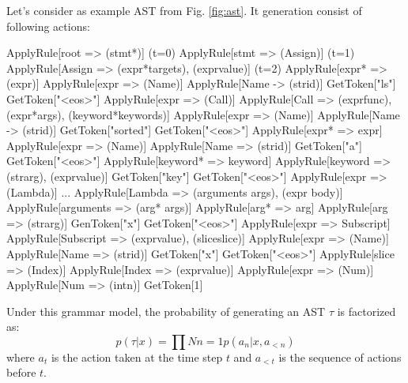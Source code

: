 Let's consider as example AST from Fig. \ref{fig:ast}. It generation consist of following actions:

\begin{codelist}
ApplyRule[root => (stmt*)] (t=0)
    ApplyRule[stmt => (Assign)] (t=1)
        ApplyRule[Assign => (expr*{targets}), (expr{value})] (t=2)
            ApplyRule[expr* => (expr)]
                ApplyRule[expr => (Name)]
                    ApplyRule[Name -> (str{id})]
                        GetToken["ls"]
                        GetToken["<eos>"]
            ApplyRule[expr => (Call)]
                ApplyRule[Call => (expr{func}), (expr*{args}), (keyword*{keywords})]
                    ApplyRule[expr => (Name)]
                        ApplyRule[Name -> (str{id})]
                            GetToken["sorted"]
                            GetToken["<eos>"]
                    ApplyRule[expr* => expr]
                        ApplyRule[expr => (Name)]
                            ApplyRule[Name => (str{id})]
                                GetToken["a"]
                                GetToken["<eos>"]
                    ApplyRule[keyword* => keyword]
                        ApplyRule[keyword => (str{arg}), (expr{value})]
                            GetToken["key"]
                            GetToken["<eos>"]
                            ApplyRule[expr => (Lambda)]
...
ApplyRule[Lambda => (arguments args), (expr body)]
    ApplyRule[arguments => (arg* args)]
        ApplyRule[arg* => arg]
            ApplyRule[arg => (str{arg})]
                GenToken["x"]
                GetToken["<eos>"]
    ApplyRule[expr => Subscript]
        ApplyRule[Subscript => (expr{value}), (slice{slice})]
            ApplyRule[expr => (Name)]
                ApplyRule[Name => (str{id})]
                    GetToken["x"]
                    GetToken["<eos>"]
            ApplyRule[slice => (Index)]
                ApplyRule[Index => (expr{value})]
                    ApplyRule[expr => (Num)]
                        ApplyRule[Num => (int{n})]
                            GetToken[1]
\end{codelist}
\label{code:ast_production}

Under this grammar model, the probability of generating an AST $\tau$ is factorized as:
\begin{equation}
p(\tau|x) = \prod{N}{n=1} p(a_n|x, a_{<n})
\label{eqn:factorized}
\end{equation}
where $a_t$ is the action taken at the time step $t$ and $a_{<t}$ is the sequence of actions before $t$. 

